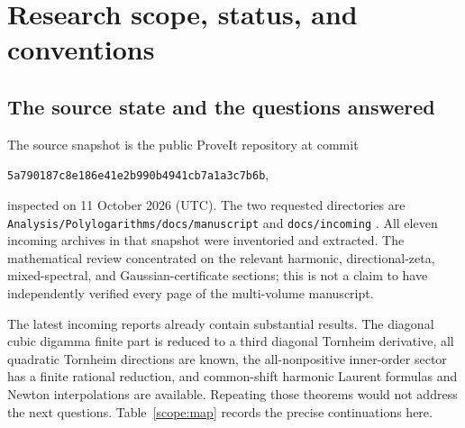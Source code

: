 \documentclass[11pt]{article}
\numberwithin{equation}{section}
\theoremstyle{plain}
\theoremstyle{definition}
\theoremstyle{remark}
\newcommand{\src}[1]{\nolinkurl{#1}}
\begin{document}
\clearpage
\tableofcontents
\clearpage

\section{Research scope, status, and conventions}
\label{scope:section}

\subsection{The source state and the questions answered}

The source snapshot is the public ProveIt repository at commit
\begin{center}
\texttt{5a790187c8e186e41e2b990b4941cb7a1a3c7b6b},
\end{center}
inspected on 11 October 2026 (UTC). The two requested directories are
\src{Analysis/Polylogarithms/docs/manuscript} and \src{docs/incoming}
\cite{RepoMain,RepoIncoming}. All eleven incoming archives in that
snapshot were inventoried and extracted. The mathematical review
concentrated on the relevant harmonic, directional-zeta, mixed-spectral,
and Gaussian-certificate sections; this is not a claim to have
independently verified every page of the multi-volume manuscript.

The latest incoming reports already contain substantial results.
The diagonal cubic digamma finite part is reduced to a third diagonal
Tornheim derivative, all quadratic Tornheim directions are known, the
all-nonpositive inner-order sector has a finite rational reduction,
and common-shift harmonic Laurent formulas and Newton interpolations
are available. Repeating those theorems would not address the next
questions. Table~\ref{scope:map} records the precise continuations here.
\end{document}
